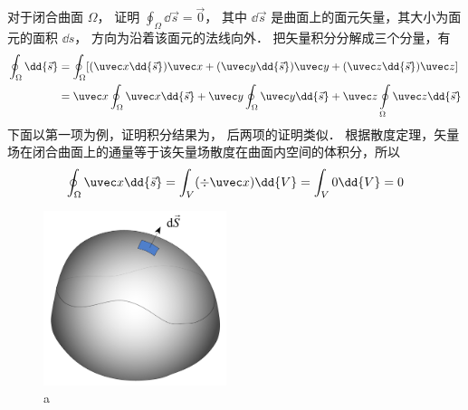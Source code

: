 
对于闭合曲面 $\Omega$，  证明 $\oint_\Omega  \dd{\vec s} = \vec 0$， 其中 $\dd{\vec s}$ 是曲面上的面元矢量，其大小为面元的面积 $\dd{s}$，  方向为沿着该面元的法线向外．
把矢量积分分解成三个分量，有
\begin{equation}
\begin{aligned}
\oint_\Omega  \dd{\vec s} & = \oint_\Omega  [(\uvec x \dd{\vec s})\uvec x + (\uvec y \dd{\vec s})\uvec y + (\uvec z \dd{\vec s})\uvec z] \\
&= \uvec x\oint_\Omega  \uvec x \dd{\vec s}  + \uvec y\oint_\Omega \uvec y \dd{\vec s} + \uvec z\oint\limits_\Omega \uvec z \dd{\vec s}
\end{aligned}
\end{equation}
下面以第一项为例，证明积分结果为， 后两项的证明类似．
根据散度定理，矢量场在闭合曲面上的通量等于该矢量场散度在曲面内空间的体积分，所以
\begin{equation}
\oint_\Omega  \uvec x \dd{\vec s}  = \int_V (\div \uvec x) \dd{V}  = \int_V 0 \dd{V}  = 0
\end{equation}
\begin{figure}[ht]
\centering
\includegraphics[width=5.34cm]{./figures/CSI01.pdf}
\caption{a} \label{CSI0_fig1}
\end{figure}

 
 

